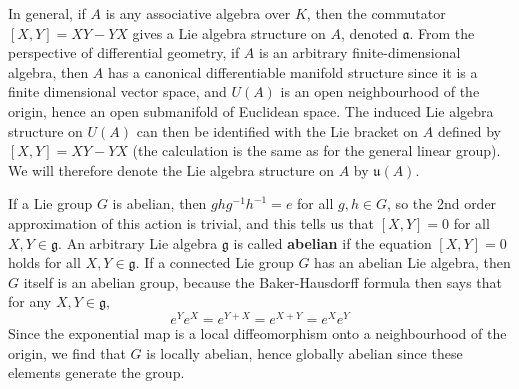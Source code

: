 \begin{example}
    In general, if $A$ is any associative algebra over $K$, then the commutator $[X,Y] = XY - YX$ gives a Lie algebra structure on $A$, denoted $\mathfrak{a}$. From the perspective of differential geometry, if $A$ is an arbitrary finite-dimensional algebra, then $A$ has a canonical differentiable manifold structure since it is a finite dimensional vector space, and $U(A)$ is an open neighbourhood of the origin, hence an open submanifold of Euclidean space. The induced Lie algebra structure on $U(A)$ can then be identified with the Lie bracket on $A$ defined by $[X,Y] = XY - YX$ (the calculation is the same as for the general linear group). We will therefore denote the Lie algebra structure on $A$ by $\mathfrak{u}(A)$.
\end{example}

\begin{example}
    If a Lie group $G$ is abelian, then $ghg^{-1}h^{-1} = e$ for all $g,h \in G$, so the 2nd order approximation of this action is trivial, and this tells us that $[X,Y] = 0$ for all $X,Y \in \mathfrak{g}$. An arbitrary Lie algebra $\mathfrak{g}$ is called {\bf abelian} if the equation $[X,Y] = 0$ holds for all $X,Y \in \mathfrak{g}$. If a connected Lie group $G$ has an abelian Lie algebra, then $G$ itself is an abelian group, because the Baker-Hausdorff formula then says that for any $X,Y \in \mathfrak{g}$,
    \[ e^Y e^X = e^{Y + X} = e^{X + Y} = e^X e^Y \]
    Since the exponential map is a local diffeomorphism onto a neighbourhood of the origin, we find that $G$ is locally abelian, hence globally abelian since these elements generate the group.
\end{example}


